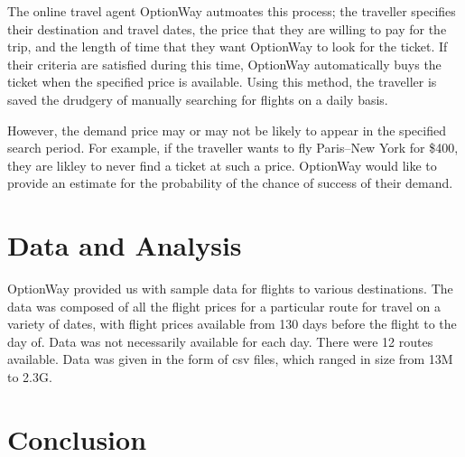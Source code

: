 \documentclass{article}
\begin{document}
The online travel agent OptionWay autmoates this process; the
traveller specifies their destination and travel dates, the price that
they are willing to pay for the trip, and the length of time that they
want OptionWay to look for the ticket.  If their criteria are
satisfied during this time, OptionWay automatically buys the ticket
when the specified price is available.  Using this method, the
traveller is saved the drudgery of manually searching for flights on a
daily basis.

However, the demand price may or may not be likely to appear in the
specified search period.  For example, if the traveller wants to fly
Paris--New York for \$400, they are likley to never find a ticket at
such a price.  OptionWay would like to provide an estimate for the
probability of the chance of success of their demand.

\section{Data and Analysis}

OptionWay provided us with sample data for flights to various
destinations.  The data was composed of all the flight prices for a
particular route for travel on a variety of dates, with flight prices
available from 130 days before the flight to the day of.  Data was not
necessarily available for each day.  There were 12 routes available.
Data was given in the form of csv files, which ranged in size from 13M
to 2.3G.



\section{Conclusion}
\end{document}
